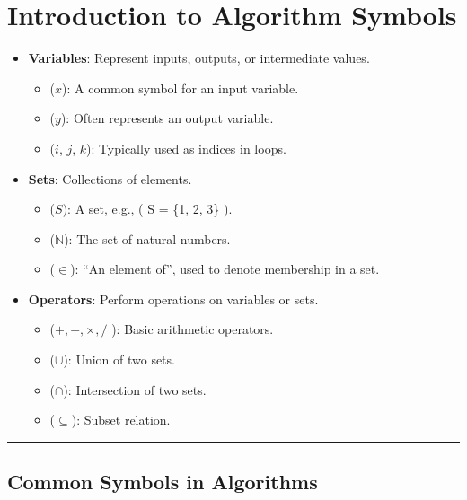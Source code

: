 \documentclass[
  letterpaper,
  DIV=11,
  numbers=noendperiod]{scrreprt}
\providecommand{\tightlist}{%
  \setlength{\itemsep}{0pt}\setlength{\parskip}{0pt}}\usepackage{longtable,booktabs,array}
\begin{document}

\chapter{Introduction to Algorithm
Symbols}\label{introduction-to-algorithm-symbols}

\begin{itemize}
\tightlist
\item
  \textbf{Variables}: Represent inputs, outputs, or intermediate values.

  \begin{itemize}
  \tightlist
  \item
    (\(x\)): A common symbol for an input variable.
  \item
    (\(y\)): Often represents an output variable.
  \item
    (\(i\), \(j\), \(k\)): Typically used as indices in loops.
  \end{itemize}
\item
  \textbf{Sets}: Collections of elements.

  \begin{itemize}
  \tightlist
  \item
    (\(S\)): A set, e.g., ( S = \{1, 2, 3\} ).
  \item
    (\(\mathbb{N}\)): The set of natural numbers.
  \item
    (\(\in\)): ``An element of'', used to denote membership in a set.
  \end{itemize}
\item
  \textbf{Operators}: Perform operations on variables or sets.

  \begin{itemize}
  \tightlist
  \item
    (\(+, -, \times, /\) ): Basic arithmetic operators.
  \item
    (\(\cup\)): Union of two sets.
  \item
    (\(\cap\)): Intersection of two sets.
  \item
    (\(\subseteq\)): Subset relation.
  \end{itemize}
\end{itemize}

\begin{center}\rule{0.5\linewidth}{0.5pt}\end{center}

\section{Common Symbols in
Algorithms}\label{common-symbols-in-algorithms}
\end{document}
